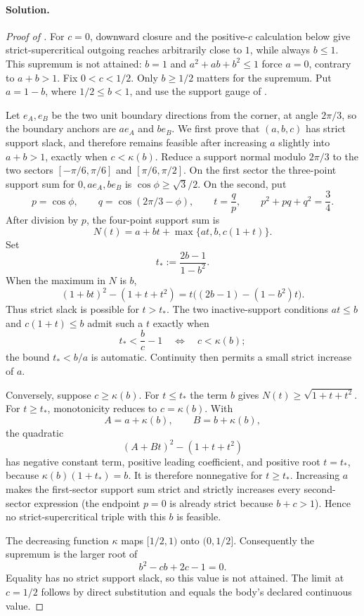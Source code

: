 \paragraph{Solution.}

\begin{proof}[Proof of ]
For $c=0$, downward closure and the positive-$c$ calculation below give
strict-supercritical outgoing reaches arbitrarily close to $1$, while always
$b\le1$.  This supremum is not attained: $b=1$ and
$a^2+ab+b^2\le1$ force $a=0$, contrary to $a+b>1$.
Fix $0<c<1/2$.  Only $b\ge1/2$ matters for the supremum.  Put
$a=1-b$, where $1/2\le b<1$, and use the support gauge of
.

Let $e_A,e_B$ be the two unit boundary directions from the corner, at angle
$2\pi/3$, so the boundary anchors are $ae_A$ and $be_B$.  We first prove
that $(a,b,c)$ has strict support slack, and therefore remains
feasible after increasing $a$ slightly into $a+b>1$, exactly when
$c<\kappa(b)$.  Reduce a support normal modulo $2\pi/3$ to the two sectors
$[-\pi/6,\pi/6]$ and $[\pi/6,\pi/2]$.  On the first sector the three-point
support sum for $0,ae_A,be_B$ is $\cos\phi\ge\sqrt3/2$.  On the second, put
\[
 p=\cos\phi,
 \qquad q=\cos(2\pi/3-\phi),
 \qquad t=\frac qp,
 \qquad p^2+pq+q^2=\frac34.
\]
After division by $p$, the four-point support sum is
\[
 N(t)=a+bt+\max\{at,b,c(1+t)\}.
\]
Set
\[
 t_*:=\frac{2b-1}{1-b^2}.
\]
When the maximum in $N$ is $b$,
\[
 (1+bt)^2-(1+t+t^2)
 =t\bigl((2b-1)-(1-b^2)t\bigr).
\]
Thus strict slack is possible for $t>t_*$.  The two inactive-support
conditions $at\le b$ and $c(1+t)\le b$ admit such a $t$ exactly when
\[
 t_*<\frac bc-1
 \quad\Longleftrightarrow\quad
 c<\kappa(b);
\]
the bound $t_*<b/a$ is automatic.  Continuity then permits a small strict
increase of $a$.

Conversely, suppose $c\ge\kappa(b)$.  For $t\le t_*$ the term $b$ gives
$N(t)\ge\sqrt{1+t+t^2}$.  For $t\ge t_*$, monotonicity reduces to
$c=\kappa(b)$.  With
\[
 A=a+\kappa(b),
 \qquad B=b+\kappa(b),
\]
the quadratic
\[
 (A+Bt)^2-(1+t+t^2)
\]
has negative constant term, positive leading coefficient, and positive root
$t=t_*$, because $\kappa(b)(1+t_*)=b$.  It is therefore nonnegative for
$t\ge t_*$.  Increasing $a$ makes the first-sector support sum strict and
strictly increases every second-sector expression (the endpoint $p=0$ is
already strict because $b+c>1$).  Hence no strict-supercritical triple with
this $b$ is feasible.

The decreasing function $\kappa$ maps $[1/2,1)$ onto $(0,1/2]$.
Consequently the supremum is the larger root of
\[
 b^2-cb+2c-1=0.
\]
Equality has no strict support slack, so this value is not attained.  The
limit at $c=1/2$ follows by direct substitution and equals the body's
declared continuous value.
\end{proof}

